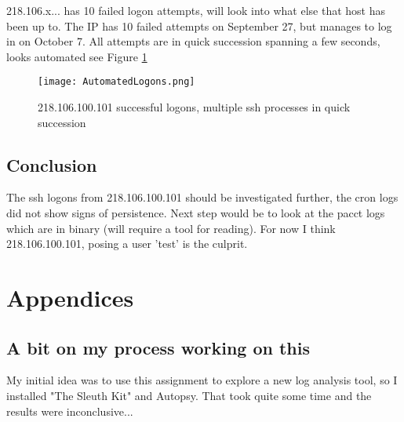 \documentclass[
	letterpaper, %
	10pt, %
	unnumberedsections, %
	twoside, %
]{APAAssignment}
\begin{document}
218.106.x... has 10 failed logon attempts, will look into what else that host has been up to. The IP has 10 failed attempts on September 27, but manages to log in on October 7. All attempts are in quick succession spanning a few seconds, looks automated see Figure \ref{fig:AutomatedLogons}

\begin{figure}[!htp] %
	\centering
	\texttt{[image: AutomatedLogons.png]}
	\caption{218.106.100.101 successful logons, multiple ssh processes in quick succession}
	\label{fig:AutomatedLogons}
\end{figure}

\section{Conclusion}
The ssh logons from 218.106.100.101 should be investigated further, the cron logs did not show signs of persistence. Next step would be to look at the pacct logs which are in binary (will require a tool for reading). For now I think 218.106.100.101, posing a user 'test' is the culprit.



\printbibliography %




%


\clearpage
\chapter{Appendices}
\begin{appendices}
	\section{A bit on my process working on this}
	My initial idea was to use this assignment to explore a new log analysis tool, so I installed "The Sleuth Kit" and Autopsy. That took quite some time and the results were inconclusive...

\end{appendices}
\end{document}
